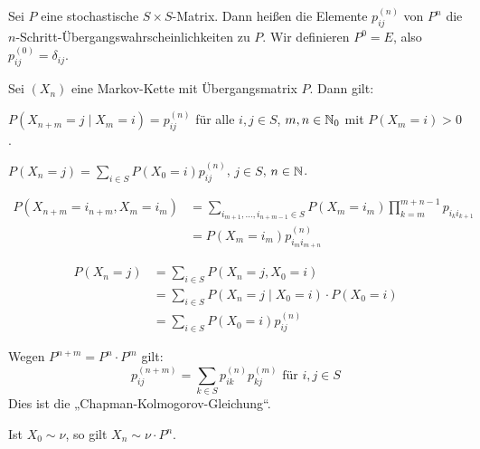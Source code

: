 \documentclass[a4paper,twoside,DIV15,BCOR12mm]{scrbook}
\begin{document}
\begin{definition}
Sei $P$ eine stochastische $S\times S$-Matrix. Dann heißen die Elemente $p_{ij}^{(n)}$ von $P^n$ die $n$-Schritt-Übergangswahrscheinlichkeiten zu $P$. Wir definieren $P^0=E$, also $p^{(0)}_{ij}= \delta_{ij}$.
\end{definition}

\begin{satz}
Sei $(X_n)$ eine Markov-Kette mit Übergangsmatrix $P$. Dann gilt:
\begin{enuma}
\item $P(X_{n+m} = j\mid X_m = i) = p_{ij}^{(n)}$ für alle $i,j\in S$, $m,n\in\mathbb{N}_0$ mit $P(X_m=i)>0$.
\item $P(X_n = j) = \sum_{i\in S} P(X_0=i)p_{ij}^{(n)}$, $j\in S$, $n\in\mathbb{N}$.
\end{enuma}
\end{satz}

\begin{beweis}
\begin{enuma}
\item 
\begin{align*}
P(X_{n+m} =i_{n+m} , X_m=i_m) &= \sum_{i_{m+1},\ldots,i_{n+m-1}\in S} P(X_m = i_m) \prod_{k=m}^{m+n-1} p_{i_ki_{k+1}} \\
&= P(X_m = i_m) p_{i_mi_{m+n}}^{(n)}
\end{align*}
\item 
\begin{align*}
P(X_n=j) &= \sum_{i\in S} P(X_n=j, X_0=i) \\
&= \sum_{i\in S} P(X_n = j \mid X_0 = i)\cdot P(X_0 = i) \\
&= \sum_{i\in S} P(X_0 = i) p_{ij}^{(n)}
\end{align*}
\end{enuma}
\end{beweis}

\begin{bemerkung}
\begin{enumi}
\item Wegen $P^{n+m}  = P^n \cdot P^m$ gilt: 
\[
p_{ij}^{(n+m)}  = \sum_{k\in S} p_{ik}^{(n)}p_{kj}^{(m)} \text{ für } i,j\in S
\]
Dies ist die „Chapman-Kolmogorov-Gleichung“.
\item Ist $X_0 \sim \nu$, so gilt $X_n \sim \nu\cdot P^n$.
\end{enumi}
\end{bemerkung}
\end{document}
